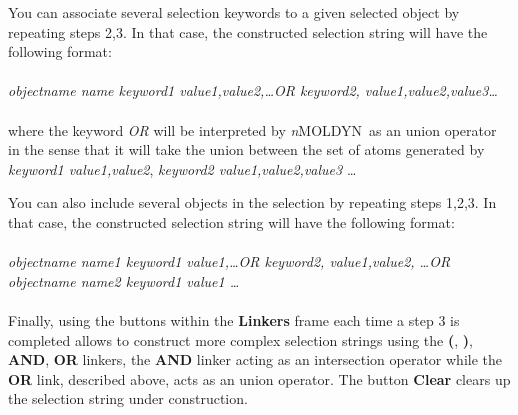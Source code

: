 \documentclass[a4paper,11pt]{report}
\newcommand{\NMOLDYN}{\textit{n}MOLDYN}
\begin{document}
You can associate several selection keywords to a given selected object by repeating steps 2,3. In that case, 
the constructed selection string will have the following format:
\\\\
\textit{objectname name keyword1 value1,value2,\ldots OR keyword2, value1,value2,value3\ldots}
\\\\
where the keyword \textit{OR} will be interpreted by \NMOLDYN\ as an union operator in the sense that it will take the 
union between the set of atoms generated by \textit{keyword1 value1,value2}, \textit{keyword2 value1,value2,value3} \ldots

You can also include several objects in the selection by repeating steps 1,2,3. In that case, the constructed selection 
string will have the following format:
\\\\
\textit{objectname name1 keyword1 value1,\ldots OR keyword2, value1,value2, \ldots OR objectname name2 keyword1 value1 \ldots}
\\\\
Finally, using the buttons within the \textbf{Linkers} frame each time a step 3 is completed allows to construct more complex selection strings using the 
\textbf{(}, \textbf{)}, \textbf{AND}, \textbf{OR} linkers, the \textbf{AND} linker acting as an intersection operator while the 
\textbf{OR} link, described above, acts as an union operator. The button \textbf{Clear} clears up the selection string under construction.
\end{document}
